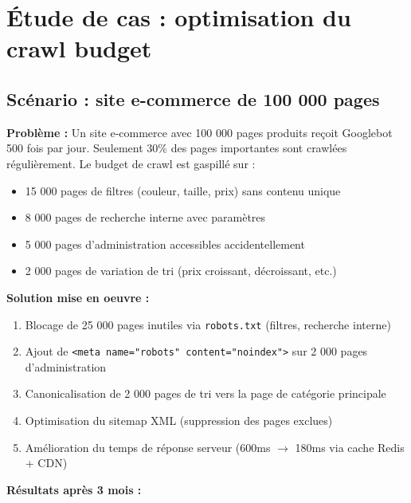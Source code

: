 \documentclass[12pt,a4paper,twoside]{report}
\begin{document}
\section{Étude de cas : optimisation du crawl budget}

\subsection{Scénario : site e-commerce de 100 000 pages}

\textbf{Problème :} Un site e-commerce avec 100 000 pages produits reçoit Googlebot 500 fois par jour. Seulement 30\% des pages importantes sont crawlées régulièrement. Le budget de crawl est gaspillé sur :

\begin{itemize}
    \item 15 000 pages de filtres (couleur, taille, prix) sans contenu unique
    \item 8 000 pages de recherche interne avec paramètres
    \item 5 000 pages d'administration accessibles accidentellement
    \item 2 000 pages de variation de tri (prix croissant, décroissant, etc.)
\end{itemize}

\textbf{Solution mise en oeuvre :}
\begin{enumerate}
    \item Blocage de 25 000 pages inutiles via \texttt{robots.txt} (filtres, recherche interne)
    \item Ajout de \texttt{<meta name="robots" content="noindex">} sur 2 000 pages d'administration
    \item Canonicalisation de 2 000 pages de tri vers la page de catégorie principale
    \item Optimisation du sitemap XML (suppression des pages exclues)
    \item Amélioration du temps de réponse serveur (600ms $\rightarrow$ 180ms via cache Redis + CDN)
\end{enumerate}

\textbf{Résultats après 3 mois :}
\end{document}
